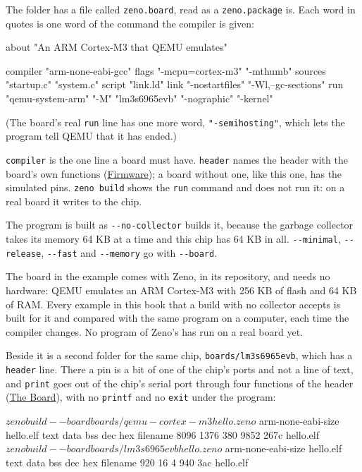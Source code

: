 The folder has a file called \verb|zeno.board|, read as a
\verb|zeno.package| is. Each word in quotes is one word of the command
the compiler is given:

\begin{zenofrag}[lang=shell]
about "An ARM Cortex-M3 that QEMU emulates"

compiler "arm-none-eabi-gcc"
flags "-mcpu=cortex-m3" "-mthumb"
sources "startup.c" "system.c"
script "link.ld"
link "-nostartfiles" "-Wl,--gc-sections"
run "qemu-system-arm" "-M" "lm3s6965evb" "-nographic" "-kernel"
\end{zenofrag}

(The board's real \verb|run| line has one more word,
\verb|"-semihosting"|, which lets the program tell QEMU that it has
ended.)

\verb|compiler| is the one line a board must have. \verb|header| names
the header with the board's own functions
(\hyperref[ch-firmware]{Firmware}); a board without one, like this
one, has the simulated pins. \verb|zeno build| shows the \verb|run|
command and does not run it: on a real board it writes to the chip.

The program is built as \verb|--no-collector| builds it, because the
garbage collector takes its memory 64 KB at a time and this chip has
64 KB in all. \verb|--minimal|, \verb|--release|, \verb|--fast| and
\verb|--memory| go with \verb|--board|.

The board in the example comes with Zeno, in its repository, and needs
no hardware: QEMU emulates an ARM Cortex-M3 with 256 KB of flash and
64 KB of RAM. Every example in this book that a build with no
collector accepts is built for it and compared with the same program
on a computer, each time the compiler changes. No program of Zeno's
has run on a real board yet.

Beside it is a second folder for the same chip,
\verb|boards/lm3s6965evb|, which has a \verb|header| line. There a pin
is a bit of one of the chip's ports and not a line of text, and
\verb|print| goes out of the chip's serial port through four functions
of the header (\hyperref[ch-board]{The Board}), with no \verb|printf|
and no \verb|exit| under the program:

\begin{zenofrag}[lang=shell]
$ zeno build --board boards/qemu-cortex-m3 hello.zeno
$ arm-none-eabi-size hello.elf
   text    data     bss     dec     hex filename
   8096    1376     380    9852    267c hello.elf
$ zeno build --board boards/lm3s6965evb hello.zeno
$ arm-none-eabi-size hello.elf
   text    data     bss     dec     hex filename
    920      16       4     940     3ac hello.elf
\end{zenofrag}

